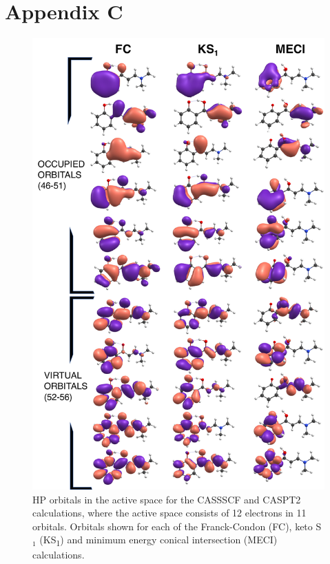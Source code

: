 \documentclass[a4paper,11.5pt]{report}
\def\sone{S$_{1}$}
\begin{document}
\section*{Appendix C}
\label{appendix2}
\begin{figure}[H]
\centering
  \includegraphics[width=0.9\linewidth]{Misc/CAS_ORBITALS.pdf}
  \caption[CASSCF and CASPT2 space used in Chapter \ref{chapter: Connecting}.]{HP orbitals in the active space for the CASSSCF and CASPT2 calculations, where the active space consists of 12 electrons in 11 orbitals. Orbitals shown for each of the Franck-Condon (FC), keto \sone{} (KS\textsubscript{1}) and minimum energy conical intersection (MECI) calculations.}
  \label{figure: HP_CASSCF_Orbitals}
\end{figure}
\end{document}
